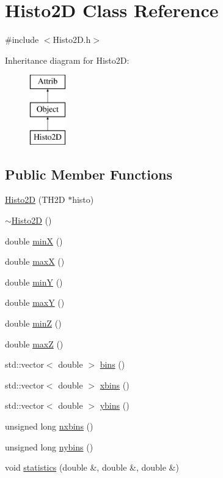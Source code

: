 \hypertarget{classHisto2D}{}\section{Histo2D Class Reference}
\label{classHisto2D}


{\ttfamily \#include $<$Histo2\+D.\+h$>$}

Inheritance diagram for Histo2D\+:\begin{figure}[H]
\begin{center}
\leavevmode
\includegraphics[height=3.000000cm]{classHisto2D}
\end{center}
\end{figure}
\subsection*{Public Member Functions}
\begin{DoxyCompactItemize}
\item 
\hyperlink{classHisto2D_acdeb6b732d7b596dea8a282813cd1c18}{Histo2D} (T\+H2D $\ast$histo)
\item 
\hyperlink{classHisto2D_a4df8112579be6bc1d5652933c73125ae}{$\sim$\+Histo2D} ()
\item 
double \hyperlink{classHisto2D_ae5a3ff63669999c9fda448db61e5bb57}{minX} ()
\item 
double \hyperlink{classHisto2D_aae04c13ac492562532b4d3f82979a0f4}{maxX} ()
\item 
double \hyperlink{classHisto2D_ae946ecc8e7b4efc2e1454cd75c7d8aca}{minY} ()
\item 
double \hyperlink{classHisto2D_a7bfc748b81257716316a38e628c5832f}{maxY} ()
\item 
double \hyperlink{classHisto2D_a68cfc2d92fbc5ce2efa1d6b5781ea621}{minZ} ()
\item 
double \hyperlink{classHisto2D_ad6ccf8ddd4e4b5930f39284059577570}{maxZ} ()
\item 
std\+::vector$<$ double $>$ \hyperlink{classHisto2D_ab3d44a1cb12119a2244065af2b1f7099}{bins} ()
\item 
std\+::vector$<$ double $>$ \hyperlink{classHisto2D_a8f42529a5fba07c339e547bf504dd418}{xbins} ()
\item 
std\+::vector$<$ double $>$ \hyperlink{classHisto2D_a0ae225e33eb9837137b10a159ac1d4f2}{ybins} ()
\item 
unsigned long \hyperlink{classHisto2D_aac422991db96030ce7ca3952e4d277f2}{nxbins} ()
\item 
unsigned long \hyperlink{classHisto2D_a17ee49d9e1c5d62edc887f4f63f68db6}{nybins} ()
\item 
void \hyperlink{classHisto2D_a66875cb46a7e5ff6fa347fe736cbed1b}{statistics} (double \&, double \&, double \&)
\end{DoxyCompactItemize}

